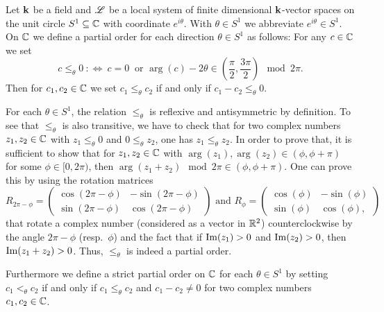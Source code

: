 Let $\mathbf{k}$ be a field and $\mathscr{L}$ be a local system of finite dimensional $\mathbf{k}$-vector spaces on the unit circle $S^1 \subseteq \mathbb{C}$ with coordinate $e^{i\theta}$. With $\theta \in S^1$ we abbreviate $e^{i\theta}\in S^1$. On $\mathbb{C}$ we define a partial order for each direction $\theta \in S^1$ as follows: For any $c \in \mathbb{C}$ we set
\[
c \leq_\theta 0 ~:\Longleftrightarrow~c = 0 ~ \text{ or }  \arg(c) - 2 \theta \in \left( \frac{\pi}{2}, \frac{3\pi}{2}\right) \mod 2 \pi.
\]
Then for $c_1, c_2 \in \mathbb{C}$ we set $c_1 \leq_\theta c_2$ if and only if $c_1 -c_2 \leq_\theta 0$. 

\begin{rem} For each $\theta \in S^1$, the relation $\leq_{\theta}$ is reflexive and antisymmetric by definition. To see that $\leq_{\theta}$ is also transitive, we have to check that for two complex numbers $z_1,z_2 \in \mathbb{C}$ with $z_1 \leq_\theta 0$ and $0 \leq_\theta z_2$, one has $z_1 \leq_\theta z_2$. In order to prove that, it is sufficient to show that for $z_1,z_2 \in \mathbb{C}$ with $\arg(z_1),\arg(z_2) \in (\phi, \phi+\pi)$ for some $\phi \in [0,2\pi)$, then $\arg(z_1+z_2) \mod 2\pi \in (\phi,\phi+\pi)$. One can prove this by using the rotation matrices \[R_{2\pi-\phi} = \begin{pmatrix}
    \cos(2\pi-\phi) & -\sin(2\pi-\phi) \\
    \sin(2\pi-\phi) & \cos(2\pi-\phi)
\end{pmatrix} \text{ and } R_{\phi}= \begin{pmatrix}
    \cos(\phi) & -\sin(\phi) \\
    \sin(\phi) & \cos(\phi),
\end{pmatrix}\] that rotate a complex number (considered as a vector in $\mathbb{R}^2$) counterclockwise by the angle $2\pi-\phi$ (resp.\ $\phi$) and the fact that if $\operatorname{Im}(z_1) > 0$ and $\operatorname{Im}(z_2)>0$, then $\operatorname{Im}(z_1+z_2) >0$. Thus, $\leq_{\theta}$ is indeed a partial order.
\end{rem}

Furthermore we define a strict partial order on $\mathbb{C}$ for each $\theta \in S^1$ by setting $c_1 <_\theta c_2 $ if and only if $c_1 \leq_\theta c_2$ and $c_1 -c_2 \neq 0$ for two complex numbers $c_1,c_2 \in \mathbb{C}$.


